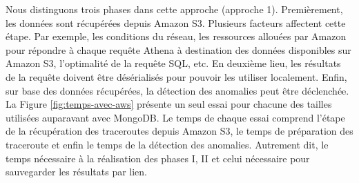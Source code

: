 Nous distinguons trois phases dans cette approche (approche 1). Premièrement,  les données sont récupérées depuis Amazon S3. Plusieurs facteurs affectent cette étape. Par exemple,  les conditions du réseau, les ressources allouées par Amazon pour répondre à chaque requête  Athena à destination des données disponibles sur Amazon S3, l'optimalité de la requête SQL, etc.  En deuxième lieu, les résultats de la requête doivent être désérialisés pour pouvoir les utiliser localement. Enfin, sur base des données récupérées, la détection des anomalies peut être déclenchée.
%
%
%	
%		
La Figure \ref{fig:temps-avec-aws} présente un seul essai pour chacune des tailles utilisées auparavant avec MongoDB.  Le temps de chaque essai comprend l'étape de la récupération des traceroutes depuis Amazon S3, le temps de préparation des traceroute et enfin le temps de la détection des anomalies. Autrement dit, le temps nécessaire à la réalisation des phases I, II et celui nécessaire pour sauvegarder les résultats par lien.

